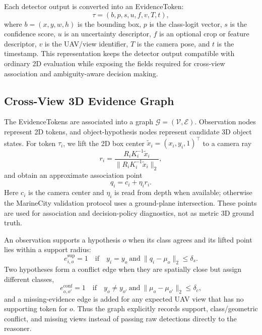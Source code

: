 Each detector output is converted into an EvidenceToken:
\begin{equation}
\tau = (b, p, s, u, f, v, T, t),
\end{equation}
where $b=(x,y,w,h)$ is the bounding box, $p$ is the class-logit vector, $s$ is
the confidence score, $u$ is an uncertainty descriptor, $f$ is an optional crop
or feature descriptor, $v$ is the UAV/view identifier, $T$ is the camera pose,
and $t$ is the timestamp. This representation keeps the detector output
compatible with ordinary 2D evaluation while exposing the fields required for
cross-view association and ambiguity-aware decision making.

\subsection{Cross-View 3D Evidence Graph}
\label{sec:method_evidence_graph}

The EvidenceTokens are associated into a graph
$\mathcal{G}=(\mathcal{V},\mathcal{E})$. Observation nodes represent 2D tokens,
and object-hypothesis nodes represent candidate 3D object states. For token
$\tau_i$, we lift the 2D box center $\tilde{x}_i=(x_i,y_i,1)^\top$ to a camera
ray
\begin{equation}
r_i=\frac{R_i K_i^{-1}\tilde{x}_i}{\|R_i K_i^{-1}\tilde{x}_i\|_2},
\end{equation}
and obtain an approximate association point
\begin{equation}
q_i=c_i+\eta_i r_i .
\end{equation}
Here $c_i$ is the camera center and $\eta_i$ is read from depth when available;
otherwise the MarineCity validation protocol uses a ground-plane intersection. These
points are used for association and decision-policy diagnostics, not as metric 3D
ground truth.

An observation supports a hypothesis $o$ when its class agrees and its lifted
point lies within a support radius:
\begin{equation}
e^{\mathrm{sup}}_{i,o}=1
\quad \mathrm{if}\quad
y_i=y_o \ \mathrm{and}\ \|q_i-\mu_o\|_2 \le \delta_s .
\end{equation}
Two hypotheses form a conflict edge when they are spatially close but assign
different classes,
\begin{equation}
e^{\mathrm{conf}}_{o,o'}=1
\quad \mathrm{if}\quad
y_o\ne y_{o'} \ \mathrm{and}\ \|\mu_o-\mu_{o'}\|_2 \le \delta_c ,
\end{equation}
and a missing-evidence edge is added for any expected UAV view that has no
supporting token for $o$. Thus the graph explicitly records support,
class/geometric conflict, and missing views instead of passing raw detections
directly to the reasoner.

